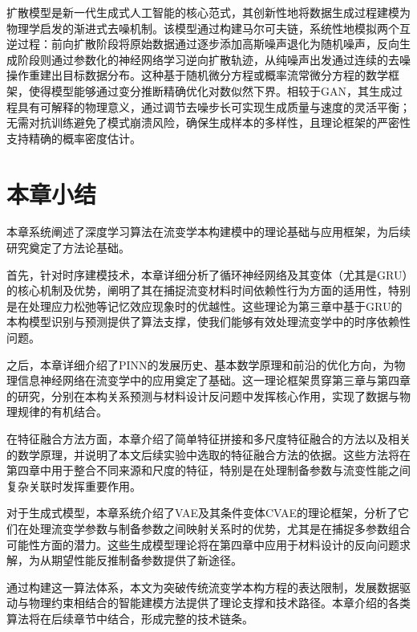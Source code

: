 扩散模型是新一代生成式人工智能的核心范式，其创新性地将数据生成过程建模为物理学启发的渐进式去噪机制\cite{ho2020denoising}。该模型通过构建马尔可夫链，系统性地模拟两个互逆过程：前向扩散阶段将原始数据通过逐步添加高斯噪声退化为随机噪声，反向生成阶段则通过参数化的神经网络学习逆向扩散轨迹，从纯噪声出发通过连续的去噪操作重建出目标数据分布。这种基于随机微分方程或概率流常微分方程的数学框架，使得模型能够通过变分推断精确优化对数似然下界\cite{song2020score}。相较于GAN，其生成过程具有可解释的物理意义，通过调节去噪步长可实现生成质量与速度的灵活平衡；无需对抗训练避免了模式崩溃风险，确保生成样本的多样性，且理论框架的严密性支持精确的概率密度估计\cite{Cao2024Survey}。
\section{本章小结}
本章系统阐述了深度学习算法在流变学本构建模中的理论基础与应用框架，为后续研究奠定了方法论基础。

首先，针对时序建模技术，本章详细分析了循环神经网络及其变体（尤其是GRU）的核心机制及优势，阐明了其在捕捉流变材料时间依赖性行为方面的适用性，特别是在处理应力松弛等记忆效应现象时的优越性。这些理论为第三章中基于GRU的本构模型识别与预测提供了算法支撑，使我们能够有效处理流变学中的时序依赖性问题。

之后，本章详细介绍了PINN的发展历史、基本数学原理和前沿的优化方向，为物理信息神经网络在流变学中的应用奠定了基础。这一理论框架贯穿第三章与第四章的研究，分别在本构关系预测与材料设计反问题中发挥核心作用，实现了数据与物理规律的有机结合。

在特征融合方法方面，本章介绍了简单特征拼接和多尺度特征融合的方法以及相关的数学原理，并说明了本文后续实验中选取的特征融合方法的依据。这些方法将在第四章中用于整合不同来源和尺度的特征，特别是在处理制备参数与流变性能之间复杂关联时发挥重要作用。

对于生成式模型，本章系统介绍了VAE及其条件变体CVAE的理论框架，分析了它们在处理流变学参数与制备参数之间映射关系时的优势，尤其是在捕捉多参数组合可能性方面的潜力。这些生成模型理论将在第四章中应用于材料设计的反向问题求解，为从期望性能反推制备参数提供了新途径。

通过构建这一算法体系，本文为突破传统流变学本构方程的表达限制，发展数据驱动与物理约束相结合的智能建模方法提供了理论支撑和技术路径。本章介绍的各类算法将在后续章节中结合，形成完整的技术链条。